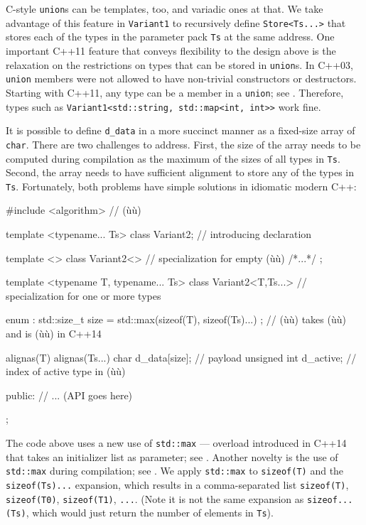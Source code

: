 \noindent C-style \lstinline!union!s can be templates, too, and variadic ones at
that. We take advantage of this feature in \lstinline!Variant1! to
recursively define \lstinline!Store<Ts...>! that stores each of the types
in the parameter pack \lstinline!Ts! at the same address. One important
C++11 feature that conveys flexibility to the design above is the
relaxation on the restrictions on types that can be stored in
\lstinline!union!s. In C++03, \lstinline!union! members were not allowed to
have non-trivial constructors or destructors. Starting with C++11, any
type can be a member in a \lstinline!union!; see . Therefore, types such as\linebreak%
\lstinline!Variant1<std::string,!~\lstinline!std::map<int,!~\lstinline!int>>!
work fine.

It is possible to define \lstinline!d_data! in a more succinct manner as a
fixed-size array of \lstinline!char!. There are two challenges to address.
First, the size of the array needs to be computed during compilation as
the maximum of the sizes of all types in \lstinline!Ts!. Second, the array
needs to have sufficient alignment to store any of the types in
\lstinline!Ts!. Fortunately, both problems have simple solutions in
idiomatic modern C++:

\begin{emcppslisting}[emcppsbatch=e37]
#include <algorithm>  // (ù{}ù)

template <typename... Ts> class Variant2;  // introducing declaration

template <> class Variant2<>     // specialization for empty (ù{}ù)
{ /*...*/ };

template <typename T, typename... Ts>
class Variant2<T,Ts...>          // specialization for one or more types
{
    enum : std::size_t { size = std::max({sizeof(T), sizeof(Ts)...}) };
        // (ù{}ù) takes (ù{}ù) and is (ù{}ù) in C++14

    alignas(T) alignas(Ts...)
    char d_data[size];           // payload
    unsigned int d_active;       // index of active type in (ù{}ù)

public:
    // ... (API goes here)
};
\end{emcppslisting}
    

\noindent The code above uses a new use of \lstinline!std::max! --- overload
introduced in C++14 that takes an initializer list as parameter; see
.
Another novelty is the use of \lstinline!std::max! during compilation; see
. We apply
\lstinline!std::max! to \lstinline!sizeof(T)! and the \lstinline!sizeof(Ts)...!
expansion, which results in a comma-separated list \lstinline!sizeof(T)!,
\lstinline!sizeof(T0)!, \lstinline!sizeof(T1)!, \lstinline!...!. (Note it is not
the same expansion as \lstinline!sizeof...(Ts)!, which would just return
the number of elements in \lstinline!Ts!).

